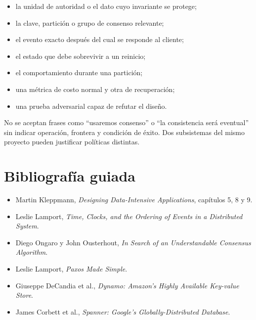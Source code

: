 \documentclass[variant=apuntes,cover=institutional,mode=screen]{ua-engineering-v6-article}
\begin{document}
\begin{itemize}
\item la unidad de autoridad o el dato cuyo invariante se protege;
\item la clave, partición o grupo de consenso relevante;
\item el evento exacto después del cual se responde al cliente;
\item el estado que debe sobrevivir a un reinicio;
\item el comportamiento durante una partición;
\item una métrica de costo normal y otra de recuperación;
\item una prueba adversarial capaz de refutar el diseño.
\end{itemize}

No se aceptan frases como ``usaremos consenso'' o ``la consistencia será eventual'' sin indicar operación, frontera y condición de éxito. Dos subsistemas del mismo proyecto pueden justificar políticas distintas.

\section{Bibliografía guiada}


\begin{itemize}
\item Martin Kleppmann, \emph{Designing Data-Intensive Applications}, capítulos 5, 8 y 9.
\item Leslie Lamport, \emph{Time, Clocks, and the Ordering of Events in a Distributed System}.
\item Diego Ongaro y John Ousterhout, \emph{In Search of an Understandable Consensus Algorithm}.
\item Leslie Lamport, \emph{Paxos Made Simple}.
\item Giuseppe DeCandia et al., \emph{Dynamo: Amazon's Highly Available Key-value Store}.
\item James Corbett et al., \emph{Spanner: Google's Globally-Distributed Database}.
\end{itemize}
\end{document}
